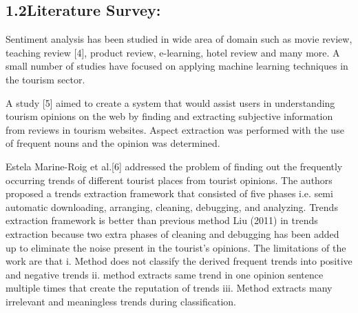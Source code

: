 \documentclass[12pt]{article}
\begin{document}
\vspace{\baselineskip}

\newpage

\vspace{\baselineskip}

\vspace{\baselineskip}

\vspace{\baselineskip}

\vspace{\baselineskip}

\vspace{\baselineskip}
\subsection*{1.2\hspace*{10pt}Literature Survey:}
\begin{justify}
\tab Sentiment analysis has been studied in wide area of domain such as movie review, teaching review [4], product review, e-learning, hotel review and many more. A small number of studies have focused on applying machine learning techniques in the tourism sector. 
\end{justify}\par


\vspace{\baselineskip}
\begin{justify}
\tab  A study [5] aimed to create a system that would assist users in understanding tourism opinions on the web by finding and extracting subjective information from reviews in tourism websites. Aspect extraction was performed with the use of frequent nouns and the opinion was determined. 
\end{justify}\par


\vspace{\baselineskip}
\begin{justify}
\tab Estela Marine-Roig et al.[6] addressed the problem of finding out the frequently occurring trends of different tourist places from tourist opinions. The authors proposed a trends extraction framework that consisted of five phases i.e. semi automatic downloading, arranging, cleaning, debugging, and analyzing. Trends extraction framework is better than previous method Liu (2011) in trends extraction because two extra phases of cleaning and debugging has been added up to eliminate the noise present in the tourist's opinions. The limitations of the work are that i. Method does not classify the derived frequent trends into positive and negative trends ii. method extracts same trend in one opinion sentence multiple times that create the reputation of trends iii. Method extracts many irrelevant and meaningless trends during classification. 
\end{justify}\par
\end{document}
